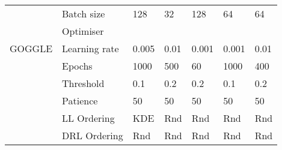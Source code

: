 \begin{table}[t]
\begin{center}
\begin{tabular}{@{}lllllll@{}}
\cmidrule{1-1}

\multirow{5}{*}{GOGGLE}  & Batch size & 128& 32&  128&64& 64 \\
& Optimiser & \adam{}&\adam{}&\adam{}&\adam{}&\adam{}\\
& Learning rate &0.005& 0.01& 0.001 & 0.001 & 0.01 \\
& Epochs &   1000 & 500 & 60 & 1000& 400 \\
& Threshold & 0.1 & 0.2 &0.2&0.1&0.2\\
& Patience & 50 & 50 & 50 & 50 & 50  \\
& LL Ordering & KDE & Rnd & Rnd & Rnd & Rnd\\
& DRL Ordering & Rnd & Rnd & Rnd & Rnd & Rnd\\

\bottomrule
\end{tabular}
\end{center}
\end{table}

